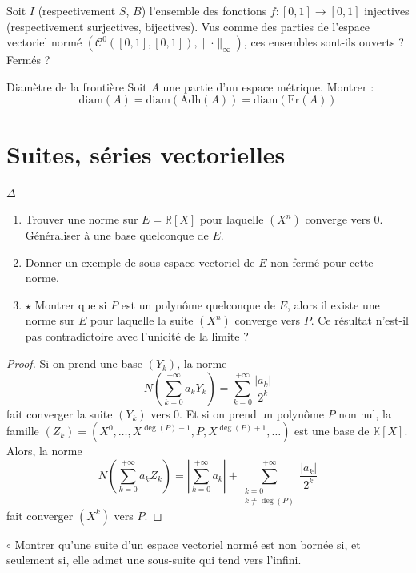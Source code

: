 \documentclass[french,a4paper]{article}
\newcommand{\R}{\mathbb{R}}
\newcommand{\K}{\mathbb{K}}
\theoremstyle{plain}
\theoremstyle{definition}
\theoremstyle{remark}
\begin{document}
\begin{ex}{}
	Soit $I$ (respectivement $S$, $B$) l'ensemble des fonctions $f:[0,1]\to[0,1]$ injectives (respectivement surjectives, bijectives). Vus comme des parties de l'espace vectoriel normé $(\mathcal{C}^0([0,1],[0,1]),\lVert\cdot\rVert_\infty)$, ces ensembles sont-ils ouverts ? Fermés ?
\end{ex}

\begin{ex}[Guindy]{Diamètre de la frontière}
	Soit $A$ une partie d'un espace métrique. Montrer : $$\text{diam}(A)=\text{diam}(\text{Adh}(A))=\text{diam}(\text{Fr}(A))$$
\end{ex}

\section{Suites, séries vectorielles}

\begin{ex}{$\Delta$} 
	\begin{enumerate}
		\item Trouver une norme sur $E=\R[X]$ pour laquelle $(X^n)$ converge vers $0$. Généraliser à une base quelconque de $E$.
		\item Donner un exemple de sous-espace vectoriel de $E$ non fermé pour cette norme.
		\item $\star$ Montrer que si $P$ est un polynôme quelconque de $E$, alors il existe une norme sur $E$ pour laquelle la suite $(X^n)$ converge vers $P$. Ce résultat n'est-il pas contradictoire avec l'unicité de la limite ?
	\end{enumerate}
\end{ex}
\begin{proof}
	Si on prend une base $(Y_k)$, la norme $$N\left(\sum_{k=0}^{+\infty}a_kY_k\right)=\sum_{k=0}^{+\infty}\frac{\lvert a_k\rvert}{2^k}$$ fait converger la suite $(Y_k)$ vers $0$. Et si on prend un polynôme $P$ non nul, la famille $(Z_k)=(X^0,\ldots,X^{\deg(P)-1},P,X^{\deg(P)+1},\ldots)$ est une base de $\K[X]$. Alors, la norme $$N\left(\sum_{k=0}^{+\infty}a_kZ_k\right)=\left\lvert\sum_{k=0}^{+\infty} a_k\right\rvert+\sum_{\substack{k=0 \\ k\ne\deg(P)}}^{+\infty}\frac{\lvert a_k\rvert}{2^k}$$ fait converger $(X^k)$ vers $P$.
\end{proof}

\begin{ex}{$\circ$}
	Montrer qu'une suite d'un espace vectoriel normé est non bornée si, et seulement si, elle admet une sous-suite qui tend vers l'infini.
\end{ex}
\end{document}
